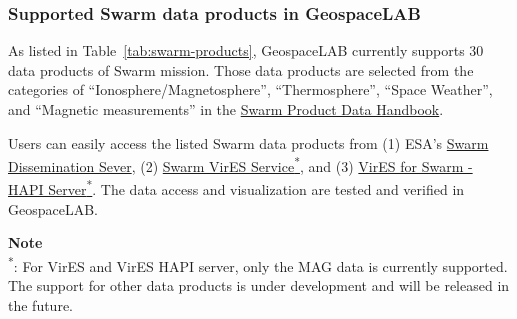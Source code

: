 \subsubsection{Supported Swarm data products in GeospaceLAB}

As listed in Table~\ref{tab:swarm-products}, GeospaceLAB currently supports 30 data products of Swarm mission. Those data products are selected from the categories of ``Ionosphere/Magnetosphere'', ``Thermosphere'', ``Space Weather'', and ``Magnetic measurements'' in the \href{https://swarmhandbook.earth.esa.int/catalogue/index}{Swarm Product Data Handbook}.

Users can easily access the listed Swarm data products from (1) ESA's \href{https://earth.esa.int/eogateway/missions/swarm/data}{Swarm Dissemination Sever}, (2) \href{https://vires.services/}{Swarm VirES Service\textsuperscript{*}}, and (3) \href{https://vires.services/hapi}{VirES for Swarm - HAPI Server\textsuperscript{*}}. The data access and visualization are tested and verified in GeospaceLAB.

\begin{framed}
\textbf{Note}\\
\textsuperscript{*}: For VirES and VirES HAPI server, only the MAG data is currently supported. The support for other data products is under development and will be released in the future.
\end{framed}

